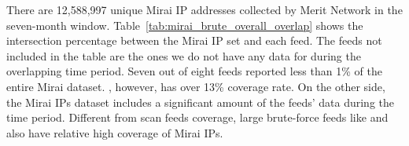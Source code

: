 \begin{table}
\small
\caption{Overall intersection between Mirai botnet and brute-force feeds,
\textit{Inter / Feed} means the intersection percentage over the feeds' sizes.
\textit{Inter / Mirai} shows the coverage percentage over entire Mirai
data size.}
\centering
\label{tab:mirai_brute_overall_overlap}
\end{table}


There are 12,588,997 unique Mirai IP addresses collected by Merit Network
in the seven-month window. Table~\ref{tab:mirai_brute_overall_overlap} shows
the intersection percentage between the Mirai IP set and each feed. The
feeds not included in the table are the ones we do not have any
data for during the overlapping time period.
Seven out of eight feeds reported less than 1\% of the entire Mirai
dataset. {\feedbadipssh}, however, has over 13\% coverage rate. On the
other side, the Mirai IPs dataset includes a significant amount of the
feeds' data during the time period. Different from scan feeds coverage,
large brute-force feeds like {\feedbadipssh} and {\feedetiprep} also have
relative high coverage of Mirai IPs.



